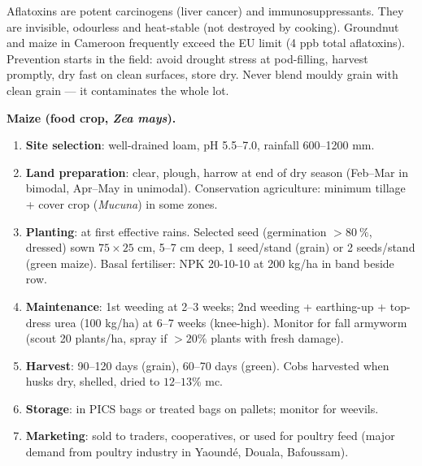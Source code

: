 \documentclass[11pt]{article}
\newcounter{popsec}
\newcounter{popsub}
\newcommand{\courssub}[1]{%
  \stepcounter{popsub}%
  \par\vspace{9pt}\noindent{\popxbold\fontsize{11.5}{13}\selectfont\color{popink}{\color{poporange}\thepopsec.\thepopsub}\hspace{6pt}#1}\par\nopagebreak\vspace{4pt}
}
\begin{document}
\begin{attention}
Aflatoxins are potent carcinogens (liver cancer) and immunosuppressants. They are invisible, odourless and heat-stable (not destroyed by cooking). Groundnut and maize in Cameroon frequently exceed the EU limit (4 ppb total aflatoxins). Prevention starts in the field: avoid drought stress at pod-filling, harvest promptly, dry fast on clean surfaces, store dry. Never blend mouldy grain with clean grain — it contaminates the whole lot.
\end{attention}

\courssub{Case Studies: Maize and Cocoa}

\textbf{Maize (food crop, \emph{Zea mays}).} 
\begin{enumerate}
\item \textbf{Site selection}: well-drained loam, pH 5.5--7.0, rainfall 600--1200 mm.
\item \textbf{Land preparation}: clear, plough, harrow at end of dry season (Feb--Mar in bimodal, Apr--May in unimodal). Conservation agriculture: minimum tillage + cover crop (\emph{Mucuna}) in some zones.
\item \textbf{Planting}: at first effective rains. Selected seed (germination $> 80\ \%$, dressed) sown $75 \times 25$ cm, 5--7 cm deep, 1 seed/stand (grain) or 2 seeds/stand (green maize). Basal fertiliser: NPK 20-10-10 at 200 kg/ha in band beside row.
\item \textbf{Maintenance}: 1st weeding at 2--3 weeks; 2nd weeding + earthing-up + top-dress urea (100 kg/ha) at 6--7 weeks (knee-high). Monitor for fall armyworm (scout 20 plants/ha, spray if $>20\%$ plants with fresh damage).
\item \textbf{Harvest}: 90--120 days (grain), 60--70 days (green). Cobs harvested when husks dry, shelled, dried to $12$--$13\%$ mc.
\item \textbf{Storage}: in PICS bags or treated bags on pallets; monitor for weevils.
\item \textbf{Marketing}: sold to traders, cooperatives, or used for poultry feed (major demand from poultry industry in Yaoundé, Douala, Bafoussam).
\end{enumerate}
\end{document}
